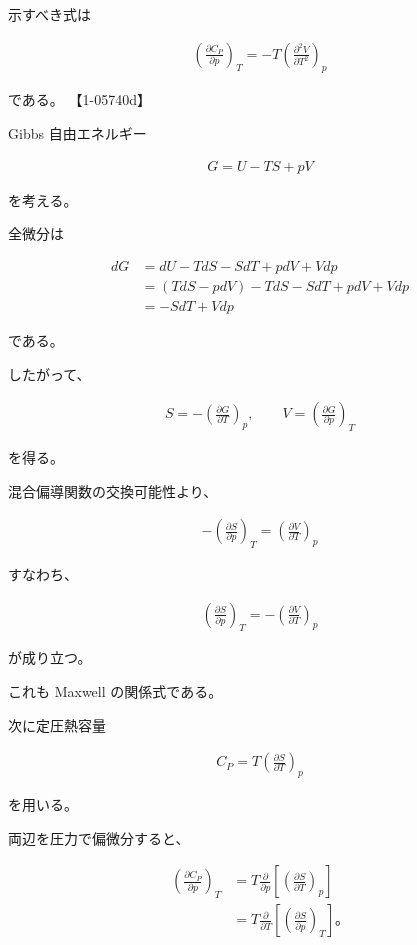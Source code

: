 \documentclass[platex,dvipdfmx,a4paper]{jsarticle}
\begin{document}
示すべき式は

\begin{align*}
\left(
\frac{\partial C_P}{\partial p}
\right)_T
=
-T
\left(
\frac{\partial^2V}{\partial T^2}
\right)_p
\end{align*}

である。 【1-05740d】

Gibbs 自由エネルギー

\begin{align*}
G
=
U-TS+pV
\end{align*}

を考える。

全微分は

\begin{align*}
dG
&=
dU-TdS-SdT+pdV+Vdp \\
&=
(TdS-pdV)-TdS-SdT+pdV+Vdp \\
&=
-SdT+Vdp
\end{align*}

である。

したがって、

\begin{align*}
S
=
-\left(
\frac{\partial G}{\partial T}
\right)_p,
\qquad
V
=
\left(
\frac{\partial G}{\partial p}
\right)_T
\end{align*}

を得る。

混合偏導関数の交換可能性より、

\begin{align*}
-
\left(
\frac{\partial S}{\partial p}
\right)_T
=
\left(
\frac{\partial V}{\partial T}
\right)_p
\end{align*}

すなわち、

\begin{align*}
\left(
\frac{\partial S}{\partial p}
\right)_T
=
-
\left(
\frac{\partial V}{\partial T}
\right)_p
\end{align*}

が成り立つ。

これも Maxwell の関係式である。

次に定圧熱容量

\begin{align*}
C_P
=
T
\left(
\frac{\partial S}{\partial T}
\right)_p
\end{align*}

を用いる。

両辺を圧力で偏微分すると、

\begin{align*}
\left(
\frac{\partial C_P}{\partial p}
\right)_T
&=
T
\frac{\partial}{\partial p}
\left[
\left(
\frac{\partial S}{\partial T}
\right)_p
\right] \\
&=
T
\frac{\partial}{\partial T}
\left[
\left(
\frac{\partial S}{\partial p}
\right)_T
\right]。
\end{align*}
\end{document}
